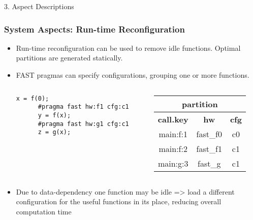 \begin{frame}[fragile]{3. Aspect Descriptions}
  \frametitle{System Aspects: Run-time Reconfiguration}
  \begin{itemize}
  \item Run-time reconfiguration can be used to remove idle
    functions. Optimal partitions are generated statically.
  \item FAST pragmas can specify configurations, grouping one
    or more functions.
    \begin{columns}
      \begin{column}{.55\textwidth}
        \begin{center}
    \begin{lstlisting}[style=MaxC]
      x = f(0);
      #pragma fast hw:f1 cfg:c1
      y = f(x);
      #pragma fast hw:g1 cfg:c1
      z = g(x);
    \end{lstlisting}
    \end{center}
    \end{column}
    \begin{column}{.45\textwidth}
      {\footnotesize
      \begin{table}[!h]
        \renewcommand{\arraystretch}{1.1}
      \hspace{-1cm}
        \begin{tabular}{c|c|c}
          \multicolumn{3}{c}{\bf{partition}} \\
          \hline
          \bf{call.key} & \bf{hw} & \bf{cfg}  \\
          \hline
          main:f:1 & fast\_f0 & c0 \\
          main:f:2 & fast\_f1 & c1 \\
          main:g:3 & fast\_g & c1 \\
        \end{tabular}
      \end{table}
    }
    \end{column}
    \end{columns}
  \item Due to data-dependency one function may be idle => load a
    different configuration for the useful functions in its place,
    reducing overall computation time
  \end{itemize}
\end{frame}

